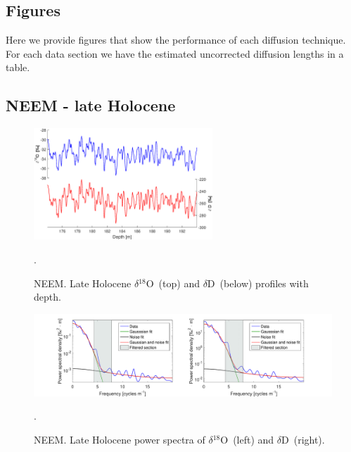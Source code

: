 \documentclass[11pt, draftcls, onecolumn]{IEEEtran} %
\numberwithin{equation}{section}
\numberwithin{table}{section}
\numberwithin{figure}{section}
\newcommand{\delOx}{$\delta{}^{18}\mathrm{O}$}
\newcommand{\delD}{$\delta\mathrm{D}$}
\begin{document}
\begin{appendices}
\clearpage
\section{Figures} \label{sec:appendix_spectra_figures}
Here we provide figures that show the performance of each diffusion technique. 
For each data section we have the estimated uncorrected diffusion lengths in a table.
\subsection{NEEM - late Holocene}

\begin{figure}[H]
	\vspace*{2mm}
	\begin{center}
		\includegraphics[width=0.6\textwidth]{NEEM_late_holo}
		\caption{NEEM. Late Holocene \delOx~(top) and \delD~(below) profiles with depth.}  \label{fig:NEEM_late_holo}.
	\end{center}
\end{figure}


\begin{figure}[H]
	\vspace*{2mm}
	\begin{center}
		\includegraphics[width=1\textwidth]{Figure_16}
		\caption{NEEM. Late Holocene power spectra of \delOx~(left) and \delD~(right).}  \label{fig:NEEM_late_fig_1}.
	\end{center}
\end{figure}


\end{appendices}
\end{document}
